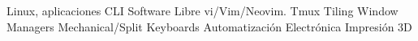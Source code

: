
\section{}

\cvlistdoubleitem
    { {Linux, aplicaciones CLI}}
    {             {Software Libre}}
\cvlistdoubleitem
    {vi/Vim/Neovim. Tmux}
    {Tiling Window Managers}
\cvlistdoubleitem
    {Mechanical/Split Keyboards}
    {              {Automatización}}
\cvlistdoubleitem
    {             {Electrónica}}
    {             {Impresión 3D}}
